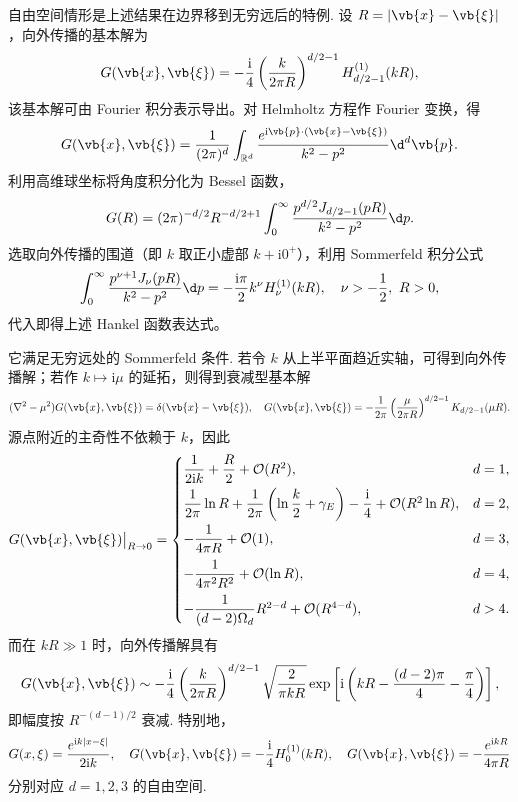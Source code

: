 自由空间情形是上述结果在边界移到无穷远后的特例. 设 \(R=\left|\vb{x}-\vb{\xi}\right|\)，向外传播的基本解为
\begin{equation*}
	G(\vb{x},\vb{\xi})=-\frac{\mathrm{i}}{4}\left(\frac{k}{2\pi R}\right)^{d/2-1}H_{d/2-1}^{(1)}(kR),
\end{equation*}
该基本解可由 Fourier 积分表示导出。对 Helmholtz 方程作 Fourier 变换，得
\begin{equation*}
	G(\vb{x},\vb{\xi})
	=\frac{1}{(2\pi)^d}\int_{\mathbb{R}^d}\frac{e^{\mathrm{i}\vb{p}\cdot(\vb{x}-\vb{\xi})}}{k^2-p^2}\d^d\vb{p}.
\end{equation*}
利用高维球坐标将角度积分化为 Bessel 函数，
\begin{equation*}
	G(R)
	=(2\pi)^{-d/2}R^{-d/2+1}\int_0^\infty\frac{p^{d/2}J_{d/2-1}(pR)}{k^2-p^2}\d p.
\end{equation*}
选取向外传播的围道（即 \(k\) 取正小虚部 \(k+\mathrm{i}0^+\)），利用 Sommerfeld 积分公式
\begin{equation*}
	\int_0^\infty\frac{p^{\nu+1}J_\nu(pR)}{k^2-p^2}\d p
	=-\frac{\mathrm{i}\pi}{2}k^\nu H_\nu^{(1)}(kR),\quad
	\nu>-\frac{1}{2},\ R>0,
\end{equation*}
代入即得上述 Hankel 函数表达式。

它满足无穷远处的 Sommerfeld 条件. 若令 \(k\) 从上半平面趋近实轴，可得到向外传播解；若作 \(k\mapsto\mathrm{i}\mu\) 的延拓，则得到衰减型基本解
\begin{equation*}
	(\nabla^2-\mu^2)G(\vb{x},\vb{\xi})=\delta(\vb{x}-\vb{\xi}),
	\quad
	G(\vb{x},\vb{\xi})=-\frac{1}{2\pi}\left(\frac{\mu}{2\pi R}\right)^{d/2-1}K_{d/2-1}(\mu R).
\end{equation*}
源点附近的主奇性不依赖于 \(k\)，因此
\begin{equation*}
	G(\vb{x},\vb{\xi})\big|_{R\to0}=\begin{cases}
		\dfrac{1}{2\mathrm{i}k}+\dfrac{R}{2}+\mathcal{O}(R^2), & d=1,\\[6pt]
		\dfrac{1}{2\pi}\ln R+\dfrac{1}{2\pi}\left(\ln\dfrac{k}{2}+\gamma_E\right)-\dfrac{\mathrm{i}}{4}+\mathcal{O}(R^2\ln R), & d=2,\\[8pt]
		-\dfrac{1}{4\pi R}+\mathcal{O}(1), & d=3,\\[8pt]
		-\dfrac{1}{4\pi^2R^2}+\mathcal{O}(\ln R), & d=4,\\[8pt]
		-\dfrac{1}{(d-2)\Omega_d}R^{2-d}+\mathcal{O}(R^{4-d}), & d>4.
	\end{cases}
\end{equation*}
而在 \(kR\gg1\) 时，向外传播解具有
\begin{equation*}
	G(\vb{x},\vb{\xi})
	\sim -\frac{\mathrm{i}}{4}\left(\frac{k}{2\pi R}\right)^{d/2-1}
	\sqrt{\frac{2}{\pi kR}}\exp\left[\mathrm{i}\left(kR-\frac{(d-2)\pi}{4}-\frac{\pi}{4}\right)\right],
\end{equation*}
即幅度按 \(R^{-(d-1)/2}\) 衰减. 特别地，
\begin{equation*}
	G(x,\xi)=\frac{e^{\mathrm{i}k|x-\xi|}}{2\mathrm{i}k},\quad
	G(\vb{x},\vb{\xi})=-\frac{\mathrm{i}}{4}H_0^{(1)}(kR),\quad
	G(\vb{x},\vb{\xi})=-\frac{e^{\mathrm{i}kR}}{4\pi R}
\end{equation*}
分别对应 \(d=1,2,3\) 的自由空间.

